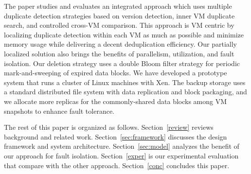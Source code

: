 The paper studies and evaluates  an integrated approach which uses  multiple duplicate detection strategies
based on  version  detection, inner VM duplicate search,
and controlled cross-VM comparison. 
This approach is VM centric by localizing duplicate detection within each VM  as much as possible
and minimize memory usage while delivering a decent deduplication efficiency. 
Our partially localized solution also brings the benefits of parallelism, utilization, and fault isolation.
Our deletion strategy uses a double Bloom filter strategy for periodic mark-and-sweeping of expired data blocks.
We have developed a prototype system that runs a cluster of Linux machines with Xen.
The backup storage uses a standard distributed file system with data replication and block packaging,
and we allocate more  replicas for the commonly-shared  data blocks among VM snapshots to enhance fault tolerance.



The rest of this paper is organized as follows.
Section~\ref{review} reviews background and related work.
Section~\ref{sec:framework}  discusses the  design framework and system architecture.
Section~\ref{sec:model}  analyzes the benefit of our approach for fault isolation. 
Section~\ref{exper} is our experimental evaluation that compare with the other approach.
Section~\ref{conc}  concludes this paper.


